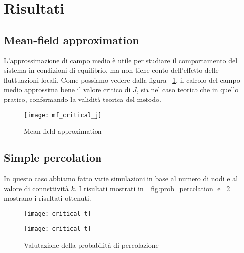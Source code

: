 \section{Risultati}\label{sec:risultati}

\subsection{Mean-field approximation}\label{subsec:res-mean-field-approximation}
    L'approssimazione di campo medio è utile per studiare il comportamento del sistema in condizioni di 
    equilibrio, ma non tiene conto dell'effetto delle fluttuazioni locali.
    Come possiamo vedere dalla figura ~\ref{fig:mf_critical_j}, il calcolo del campo medio approssima bene il valore
    critico di $J$, sia nel caso teorico che in quello pratico, confermando la validità teorica del metodo.

    \begin{figure}[h]
        \texttt{[image: mf\_critical\_j]}\caption{Mean-field approximation}
        \label{fig:mf_critical_j}
    \end{figure}

\subsection{Simple percolation}\label{subsec:res-simple-percolation}
    In questo caso abbiamo fatto varie simulazioni in base al numero di nodi e al valore di connettività $k$.
    I risultati mostrati in ~\ref{fig:prob_percolation} e ~\ref{fig:prob_percolation_2} mostrano i risultati ottenuti.

    \begin{figure}[h]
        \begin{minipage}{0.5\textwidth}
            \texttt{[image: critical\_t]}\label{fig:prob_percolation}
        \end{minipage}
        \begin{minipage}{0.5\textwidth}
            \texttt{[image: critical\_t]}\label{fig:prob_percolation_2}
        \end{minipage}
        \caption{Valutazione della probabilità di percolazione}
    \end{figure}

